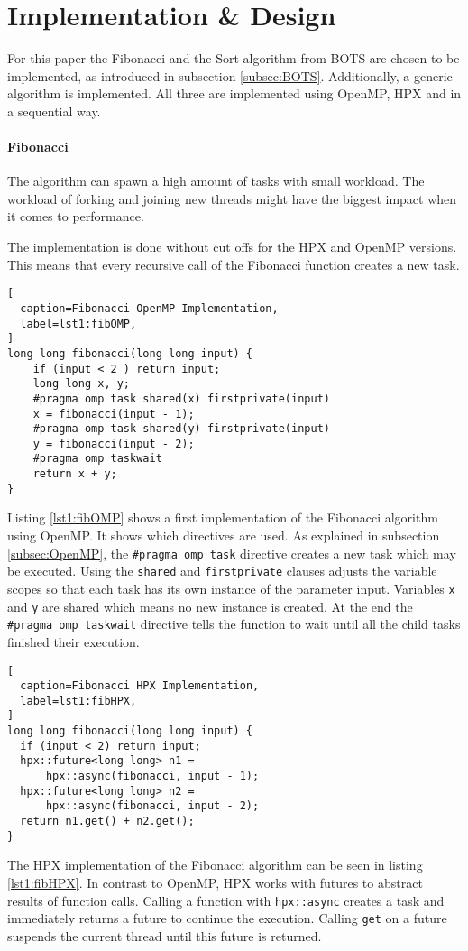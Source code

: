 \section{Implementation \& Design}
  For this paper the Fibonacci and the Sort algorithm from BOTS are chosen to be implemented, as introduced in subsection \ref{subsec:BOTS}.
  Additionally, a generic algorithm is implemented.
  All three are implemented using OpenMP, HPX and in a sequential way.
  
  \paragraph{Fibonacci}
  The algorithm can spawn a high amount of tasks with small workload.
  The workload of forking and joining new threads might have the biggest impact when it comes to performance.
  
  The implementation is done without cut offs for the HPX and OpenMP versions.
  This means that every recursive call of the Fibonacci function creates a new task.
  \begin{lstlisting}[
  caption=Fibonacci OpenMP Implementation,
  label=lst1:fibOMP,
]
long long fibonacci(long long input) {
    if (input < 2 ) return input;
    long long x, y;
    #pragma omp task shared(x) firstprivate(input)
    x = fibonacci(input - 1);
    #pragma omp task shared(y) firstprivate(input)
    y = fibonacci(input - 2);
    #pragma omp taskwait
    return x + y;
}
\end{lstlisting}
  Listing \ref{lst1:fibOMP} shows a first implementation of the Fibonacci algorithm using OpenMP.
  It shows which directives are used.
  As explained in subsection \ref{subsec:OpenMP}, the \texttt{\#pragma omp task} directive creates a new task which may be executed.
  Using the \texttt{shared} and \texttt{firstprivate} clauses adjusts the variable scopes so that each task has its own instance of the parameter input.
  Variables \texttt{x} and \texttt{y} are shared which means no new instance is created.
  At the end the \texttt{\#pragma omp taskwait} directive tells the function to wait until all the child tasks finished their execution.
  
\begin{lstlisting}[
  caption=Fibonacci HPX Implementation,
  label=lst1:fibHPX,
]
long long fibonacci(long long input) {
  if (input < 2) return input;
  hpx::future<long long> n1 =
      hpx::async(fibonacci, input - 1);
  hpx::future<long long> n2 =
      hpx::async(fibonacci, input - 2);
  return n1.get() + n2.get();
}
\end{lstlisting}
  The HPX implementation of the Fibonacci algorithm can be seen in listing \ref{lst1:fibHPX}.
  In contrast to OpenMP, HPX works with futures to abstract results of function calls.
  Calling a function with \texttt{hpx::async} creates a task and immediately returns a future to continue the execution.
  Calling \texttt{get} on a future suspends the current thread until this future is returned.
  \\
 
